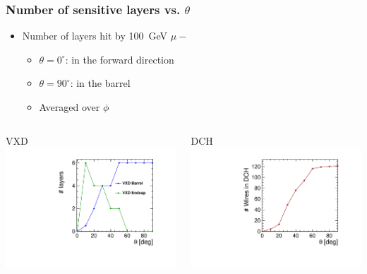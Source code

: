 \documentclass[hyperref={colorlinks=true,pdfpagelabels=false,linkcolor=black}, xcolor=dvipsnames,10pt]{beamer}
\begin{document}
\begin{frame}
	\frametitle{Number of sensitive layers vs. $\theta$}
	
	\begin{itemize}
		\item Number of layers hit by 100~GeV $\mu-$ 
		\begin{itemize}

		\item $\theta=0^{\circ}$: in the forward direction
		\item $\theta=90^{\circ}$: in the barrel
		\item Averaged over $\phi$	
		\end{itemize}
	\end{itemize}
		
	\begin{columns}	
		\begin{block}{VXD}
		\centering
		\includegraphics[width=\textwidth]{../figures/theta_nbHits_VXD.pdf}
		\end{block}
	
		\begin{block}{DCH}
		\centering
		\includegraphics[width=\textwidth]{../figures/theta_nbHits_DCH.pdf} 	
		\end{block}
	\end{columns}
	
	
\end{frame}
\end{document}
